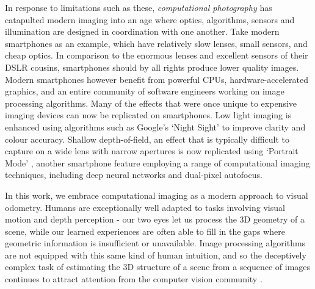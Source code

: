 In response to limitations such as these, \textit{computational photography} has catapulted modern imaging into an age where optics, algorithms, sensors and illumination are designed in coordination with one another. Take modern smartphones as an example, which have relatively slow lenses, small sensors, and cheap optics. In comparison to the enormous lenses and excellent sensors of their DSLR cousins, smartphones should by all rights produce lower quality images. Modern smartphones however benefit from powerful CPUs, hardware-accelerated graphics, and an entire community of software engineers working on image processing algorithms. Many of the effects that were once unique to expensive imaging devices can now be replicated on smartphones. Low light imaging is enhanced using algorithms such as Google's `Night Sight' \cite{levoy2019lowlight} to improve clarity and colour accuracy. Shallow depth-of-field, an effect that is typically difficult to capture on a wide lens with narrow apertures is now replicated using `Portrait Mode' \cite{wadhwa2018portraitmode}, another smartphone feature employing a range of computational imaging techniques, including deep neural networks and dual-pixel autofocus.

In this work, we embrace computational imaging as a modern approach to visual odometry. Humans are exceptionally well adapted to tasks involving visual motion and depth perception - our two eyes let us process the 3D geometry of a scene, while our learned experiences are often able to fill in the gaps where geometric information is insufficient or unavailable. Image processing algorithms are not equipped with this same kind of human intuition, and so the deceptively complex task of estimating the 3D structure of a scene from a sequence of images continues to attract attention from the computer vision community \cite{dansereau2011plenopticflow,gakne2018scale,nister2004vo,zhou2019scale}. 

